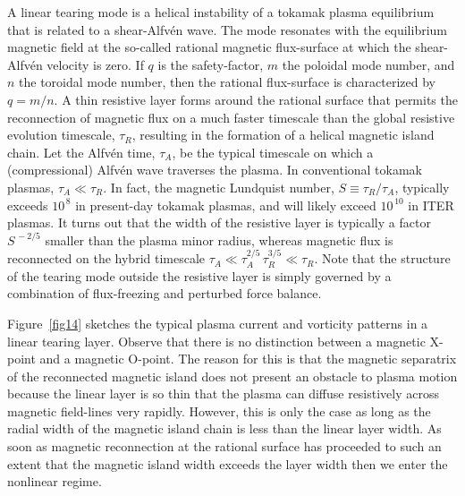\documentclass[12pt,prb,aps]{revtex4-1}
\begin{document}
A linear tearing mode is a helical instability of a tokamak plasma equilibrium that is related to a shear-Alfv\'{e}n wave.\cite{haz} The mode resonates with the equilibrium magnetic field at
the so-called rational magnetic flux-surface at which the
shear-Alfv\'{e}n velocity is zero. If $q$ is the safety-factor, $m$ the poloidal mode number, and $n$ the
toroidal mode number, then the rational
flux-surface is characterized by $q=m/n$. A thin resistive layer forms
around the rational surface that permits the reconnection of magnetic flux on a much faster timescale than the global
resistive evolution timescale, $\tau_R$, resulting in the formation of a helical magnetic island chain. Let the Alfv\'{e}n time,
$\tau_A$, be the
typical timescale on which a (compressional) Alfv\'{e}n
wave traverses the plasma.
In conventional tokamak plasmas, $\tau_A\ll \tau_R$. In fact,
the magnetic Lundquist number, $S\equiv \tau_R/\tau_A$,  typically exceeds $10^{\,8}$ in present-day tokamak plasmas,
and will likely exceed $10^{\,10}$ in ITER plasmas.
 It turns out that the width of the resistive layer is typically a factor $S^{\,-2/5}$ smaller than the
plasma minor radius, whereas magnetic flux is reconnected on
the hybrid timescale $\tau_A\ll \tau_A^{2/5}\,\tau_R^{3/5}\ll \tau_R$.\cite{fkr} Note that  the
structure of the tearing mode  outside the resistive layer is simply governed by a combination of flux-freezing and perturbed force balance. 

 Figure~\ref{fig14} sketches the typical plasma current and vorticity patterns in a linear tearing layer. Observe that there is
 no distinction between a magnetic X-point and a magnetic 
O-point. The reason for this is that the magnetic separatrix
of the reconnected magnetic island does not present an obstacle
to plasma motion because the linear layer is so thin that the
plasma can diffuse resistively across magnetic field-lines very rapidly. However, this is only the case as long
as the radial width of the magnetic island chain is less than the linear layer width. As soon as magnetic reconnection
at the rational surface has proceeded to such an extent that
the magnetic island width exceeds the layer width then we enter the nonlinear regime. 
\end{document}
